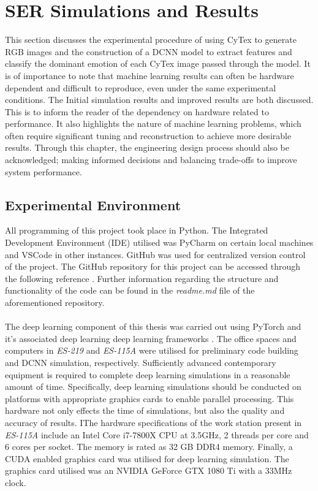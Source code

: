 \chapter{SER Simulations and Results}\label{ch-ser_sim}
This section discusses the experimental procedure of using CyTex to generate RGB images and the construction of a DCNN model to extract features and classify the dominant emotion of each CyTex image passed through the model. It is of importance to note that machine learning results can often be hardware dependent and difficult to reproduce, even under the same experimental conditions. The Initial simulation results and improved results are both discussed. This is to inform the reader of the dependency on hardware related to performance. It also highlights the nature of machine learning problems, which often require significant tuning and reconstruction to achieve more desirable results. Through this chapter, the engineering design process should also be acknowledged; making informed decisions and balancing trade-offs to improve system performance. 

\section{Experimental Environment}
All programming of this project took place in Python. The Integrated Development Environment (IDE) utilised was PyCharm on certain local machines and VSCode in other instances. GitHub was used for centralized version control of the project. The GitHub repository for this project can be accessed through the following reference \cite{Blake_ELEC4840B-Repo}. Further information regarding the structure and functionality of the code can be found in the \textit{readme.md} file of the aforementioned repository.\\ \\
The deep learning component of this thesis was carried out using PyTorch and it's associated deep learning deep learning frameworks \cite{PyTorch_Ketkar_2017}. The office spaces and computers in \textit{ES-219} and \textit{ES-115A} were utilised for preliminary code building and DCNN simulation, respectively. Sufficiently advanced contemporary equipment is required to complete deep learning simulations in a reasonable amount of time. Specifically, deep learning simulations should be conducted on platforms with appropriate graphics cards to enable parallel processing. This hardware not only effects the time of simulations, but also the quality and accuracy of results. IThe hardware specifications of the work station present in \textit{ES-115A} include an Intel Core i7-7800X CPU at 3.5GHz, 2 threads per core and 6 cores per socket. The memory is rated as 32 GB DDR4 memory. Finally, a CUDA enabled graphics card was utilised for deep learning simulation. The graphics card utilised was an NVIDIA GeForce GTX 1080 Ti with a 33MHz clock.

